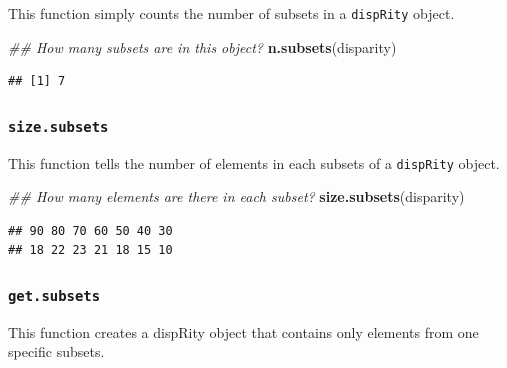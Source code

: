 \documentclass[]{book}
\newenvironment{Shaded}{\begin{snugshade}}{\end{snugshade}}
\newcommand{\CommentTok}[1]{\textcolor[rgb]{0.56,0.35,0.01}{\textit{#1}}}
\newcommand{\KeywordTok}[1]{\textcolor[rgb]{0.13,0.29,0.53}{\textbf{#1}}}
\newcommand{\NormalTok}[1]{#1}
\newcommand{\OperatorTok}[1]{\textcolor[rgb]{0.81,0.36,0.00}{\textbf{#1}}}
\newcommand{\StringTok}[1]{\textcolor[rgb]{0.31,0.60,0.02}{#1}}
\begin{document}
This function simply counts the number of subsets in a \texttt{dispRity} object.

\begin{Shaded}
\begin{Highlighting}[]
\CommentTok{## How many subsets are in this object?}
\KeywordTok{n.subsets}\NormalTok{(disparity)}
\end{Highlighting}
\end{Shaded}

\begin{verbatim}
## [1] 7
\end{verbatim}

\hypertarget{size.subsets}{%
\subsubsection{\texorpdfstring{\texttt{size.subsets}}{size.subsets}}\label{size.subsets}}

This function tells the number of elements in each subsets of a \texttt{dispRity} object.

\begin{Shaded}
\begin{Highlighting}[]
\CommentTok{## How many elements are there in each subset?}
\KeywordTok{size.subsets}\NormalTok{(disparity)}
\end{Highlighting}
\end{Shaded}

\begin{verbatim}
## 90 80 70 60 50 40 30 
## 18 22 23 21 18 15 10
\end{verbatim}

\hypertarget{get.subsets}{%
\subsubsection{\texorpdfstring{\texttt{get.subsets}}{get.subsets}}\label{get.subsets}}

This function creates a dispRity object that contains only elements from one specific subsets.

\begin{Shaded}
\end{Shaded}
\end{document}
